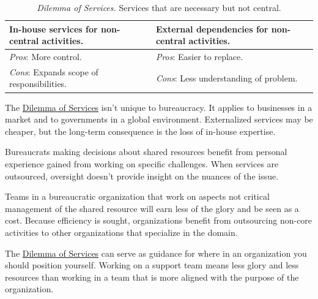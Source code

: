 \begin{center}
\begin{table}[H] %
\begin{tabular}{ | m{\dilemmatablewidth}| m{\dilemmatablewidth} | } 
  \hline
  \textbf{In-house services for non-central activities.} &
  \textbf{External dependencies for non-central activities.} \\
  \hline
  \textit{Pros}: More control. &
  \textit{Pros}: Easier to replace. \\
  \hline
  \textit{Cons}: Expands scope of responsibilities. & 
  \textit{Cons}: Less understanding of problem.  \\
  \hline
\end{tabular}
\caption{
\textit{Dilemma of Services.}
Services that are necessary but not central.
}
\label{table:inhouse-vs-external}
\end{table}
\end{center}

The \hyperref[table:inhouse-vs-external]{Dilemma of Services} isn't unique to bureaucracy. It applies to businesses in a market and to governments in a global environment. Externalized services may be cheaper, but the long-term consequence is the loss of in-house expertise. 


Bureaucrats making decisions about shared resources benefit from personal experience gained from working on specific challenges. 
When services are outsourced, oversight doesn't provide insight on the nuances of the issue.

Teams in a bureaucratic organization that work on aspects not critical management of the shared resource will earn less of the glory and be seen as a cost. Because efficiency is sought, organizations benefit from outsourcing non-core activities to other organizations that specialize in the domain.

The \hyperref[table:inhouse-vs-external]{Dilemma of Services} can serve as guidance for where in an organization you should position yourself. Working on a support team means less glory and less resources than working in a team that is more aligned with the purpose of the organization.

